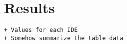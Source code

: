 \section{Results}
\label{sec:results}

\begin{verbatim}
+ Values for each IDE
+ Somehow summarize the table data
\end{verbatim}
